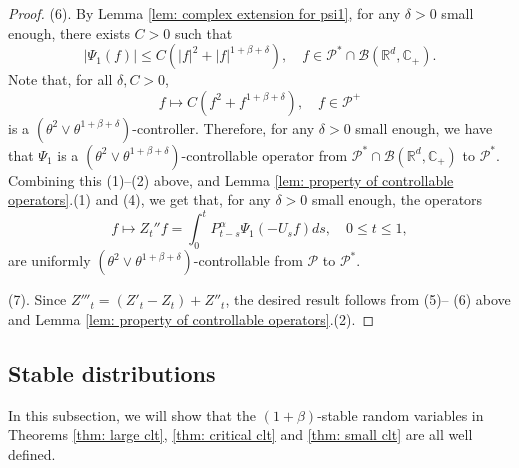 \documentclass[12pt,a4paper]{amsart}
\theoremstyle{plain}
\theoremstyle{definition}
\numberwithin{equation}{section}
\begin{document}
\begin{proof}
  (6). By  Lemma \ref{lem: complex extension for psi1}, for any $\delta > 0$ small enough, there exists  $C>0$ such that
  \[
    |\Psi_1(f)|
    \le C(|f|^2+|f|^{1+\beta+ \delta})
    , \quad f\in \mathcal P^*\cap\mathcal B(\mathbb R^d, \mathbb C_+).
  \]
  Note that, for all $\delta, C>0$,
  \[
    f \mapsto C(f^2+f^{1+\beta+\delta})
    , \quad f\in \mathcal P^+
  \]
  is a $(\theta^2 \vee \theta^{1+\beta+\delta})$-controller.
  Therefore, for any $\delta > 0$ small enough, we have that $\Psi_1$ is a $(\theta^2 \vee \theta^{1+\beta+\delta})$-controllable operator from $\mathcal P^*\cap\mathcal B(\mathbb R^d, \mathbb C_+)$ to $\mathcal P^*$.
  Combining  this  (1)--(2) above, and Lemma \ref{lem: property of controllable operators}.(1) and (4), we get that, for any $\delta > 0$ small enough, the operators
  \[
    f
    \mapsto Z_t'' f
    = \int_0^t P_{t-s}^\alpha \Psi_1(-U_sf)ds
    , \quad 0\leq t\leq 1,
  \]
  are uniformly $(\theta^2 \vee \theta^{1+\beta+\delta})$-controllable from $\mathcal P$ to $\mathcal P^*$.
  
  (7). Since $Z'''_t = (Z'_t-Z_t)+Z''_t$, the desired result follows from (5)-- (6) above and Lemma \ref{lem: property of controllable operators}.(2).
\end{proof}

\subsection{Stable distributions}
\label{sec: stable distributions}

In this subsection, we will show that the $(1+\beta)$-stable random variables in Theorems \ref{thm: large clt}, \ref{thm: critical clt} and \ref{thm: small clt} are all well defined.
\end{document}

